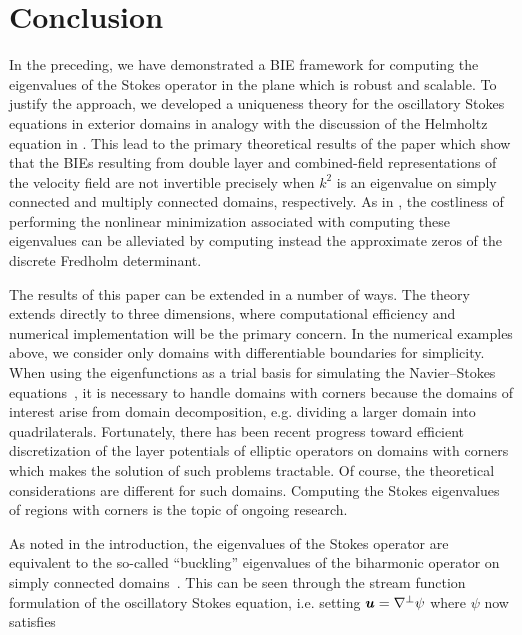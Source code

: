 \section{Conclusion}
\label{sec:conclusion}

In the preceding, we have demonstrated a
BIE framework for computing the eigenvalues
of the Stokes operator in the plane which
is robust and scalable.
%
To justify the
approach, we developed a uniqueness theory
for the oscillatory Stokes equations in
exterior domains in analogy with the
discussion of the Helmholtz equation in
\cite{colton1983integral}.
%
This lead to the primary theoretical
results of the paper which show that the
BIEs resulting from double layer and
combined-field representations of the
velocity field are 
not invertible precisely when $k^2$ is
an eigenvalue on simply connected
and multiply connected domains, respectively.
%
As in \cite{zhao2015robust}, the costliness
of performing the nonlinear minimization
associated with computing these eigenvalues
can be alleviated by computing instead the
approximate zeros of the discrete Fredholm
determinant.

The results of this paper can be
extended in a number of ways.
%
The theory
extends directly to three dimensions, where
computational efficiency and numerical
implementation will be the primary concern.
%
In the numerical examples above, we
consider only domains with differentiable
boundaries for simplicity.
%
When using the eigenfunctions as a trial
basis for simulating the Navier--Stokes
equations~\cite{batcho1994generalized},
it is necessary to handle domains
with corners because the domains of interest
arise from domain decomposition, e.g.
dividing a larger domain into 
quadrilaterals.
Fortunately, there has been recent progress
toward efficient discretization of the
layer potentials of elliptic operators
on domains with corners
\cite{helsing2008corner,serkh2016solution,rachh2017solution,helsing2018integral}
which makes the solution of such problems
tractable.
%
Of course, the theoretical considerations
are different for such domains.
%
Computing the Stokes eigenvalues of regions
with corners is the topic of ongoing
research.

As noted in the introduction, the
eigenvalues of the Stokes operator are
equivalent to the so-called
``buckling'' eigenvalues of the
biharmonic operator on simply connected
domains~\cite{kelliher2009eigenvalues}.
%
This can be seen through the stream function
formulation  of the oscillatory Stokes
equation, i.e. setting ${\boldsymbol u} = \nabla^\perp \psi$
where $\psi$ now satisfies

